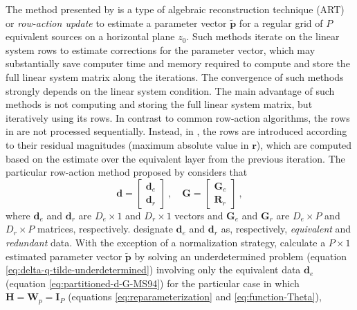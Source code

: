 \documentclass[utf8]{FrontiersinHarvard} %
\begin{document}
	The method presented by \cite{mendonca-silva1994} is a type of algebraic reconstruction technique (ART) \cite[e.g.,][p. 58]{sluis-vorst1987}
	or \textit{row-action update} \citep[e.g.,][]{elfving-etal2017} 
	to estimate a parameter vector $\tilde{\mathbf{p}}$ for a regular grid of $P$ equivalent sources on a horizontal plane $z_{0}$.
	Such methods iterate on the linear system rows to estimate corrections for the parameter vector,
	which may substantially save computer time and memory required to compute and store the full linear system matrix
	along the iterations.
	The convergence of such methods strongly depends on the linear system condition.
	The main advantage of such methods is not computing and storing the full linear system matrix, but iteratively using 
	its rows.
	In contrast to common row-action algorithms, the rows in \cite{mendonca-silva1994} are not processed sequentially. 
	Instead, in \cite{mendonca-silva1994}, the rows are introduced according to their residual magnitudes
	(maximum absolute value in $\mathbf{r}$), which are computed based on the estimate over the equivalent layer from the previous iteration.
	The particular row-action method proposed by \cite{mendonca-silva1994} considers that
	\begin{equation}
		\mathbf{d} = \begin{bmatrix}
			\mathbf{d}_{e} \\ \mathbf{d}_{r}
		\end{bmatrix} \: , \quad 
		\mathbf{G} = \begin{bmatrix}
			\mathbf{G}_{e} \\ \mathbf{R}_{r}
		\end{bmatrix} \: ,
		\label{eq:partitioned-d-G-MS94}
	\end{equation}
	where $\mathbf{d}_{e}$ and $\mathbf{d}_{r}$ are $D_{e} \times 1$ and $D_{r} \times 1$ vectors and
	$\mathbf{G}_{e}$ and $\mathbf{G}_{r}$ are $D_{e} \times P$ and $D_{r} \times P$ matrices, respectively.
	\cite{mendonca-silva1994} designate $\mathbf{d}_{e}$ and $\mathbf{d}_{r}$ as, respectively, \textit{equivalent} and \textit{redundant} data.
	With the exception of a normalization strategy, \cite{mendonca-silva1994} calculate a $P \times 1$ estimated parameter vector $\tilde{\mathbf{p}}$ 
	by solving an underdetermined problem (equation \ref{eq:delta-q-tilde-underdetermined}) involving only the equivalent data $\mathbf{d}_{e}$ 
	(equation \ref{eq:partitioned-d-G-MS94})
	for the particular case in which $\mathbf{H} = \mathbf{W}_{p} = \mathbf{I}_{P}$ (equations \ref{eq:reparameterization} and \ref{eq:function-Theta}),
\end{document}
